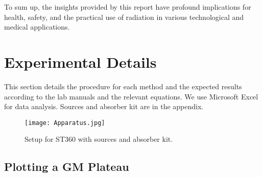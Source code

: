 \documentclass[11pt]{article}
\begin{document}
	To sum up, the insights provided by this report have profound implications for health, safety, and the practical use of radiation in various technological and medical applications.

\clearpage

	\section{Experimental Details}
	
	This section details the procedure for each method and the expected results according to the lab manuals and the relevant equations. We use Microsoft Excel for data analysis. Sources and absorber kit are in the appendix.
	
	\begin{figure}[htbp]
		\centering
		\texttt{[image: Apparatus.jpg]}
		\caption{Setup for ST360 with sources and absorber kit. \cite{manual}}
		\label{fig:Apparatus}
	\end{figure}
	
	\subsection{Plotting a GM Plateau}
	
\end{document}
